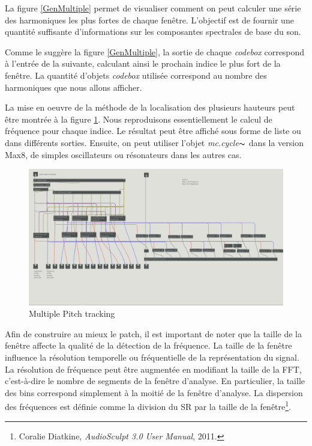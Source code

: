 La figure \ref{GenMultiple} permet de visualiser comment on peut calculer une série des harmoniques les plus fortes de chaque fenêtre. L'objectif est de fournir une quantité suffisante d'informations sur les composantes spectrales de base du son.

Comme le suggère la figure \ref{GenMultiple}, la sortie de chaque \textit{codebox} correspond à l'entrée de la suivante, calculant ainsi le prochain indice le plus fort de la fenêtre. La quantité d’objets \textit{codebox} utilisée correspond au nombre des harmoniques que nous allons afficher.

La mise en oeuvre de la méthode de la localisation des plusieurs hauteurs peut être montrée à la figure \ref{Analysis}. Nous reproduisons essentiellement le calcul de fréquence pour chaque indice. Le résultat peut être affiché sous forme de liste ou dans différents sorties. Ensuite, on peut utiliser l’objet \textit{mc.cycle$\thicksim $} dans la version Max8, de simples oscillateurs ou résonateurs dans les autres cas.

    \begin{figure}
        \centering
        \includegraphics[width = \textwidth]{Graphs/MultipleTrack.png}
        \caption{Multiple Pitch tracking}
        \label{Analysis}
    \end{figure}

Afin de construire au mieux le patch, il est important de noter que la taille de la fenêtre affecte la qualité de la détection de la fréquence. La taille de la fenêtre influence la résolution temporelle ou fréquentielle de la représentation du signal. La résolution de fréquence peut être augmentée en modifiant la taille de la FFT, c'est-à-dire le nombre de segments de la fenêtre d'analyse. En particulier, la taille des bins correspond simplement à la moitié de la fenêtre d’analyse. La dispersion des fréquences est définie comme la division du SR par la taille de la fenêtre\footnote{Coralie Diatkine, \textit{AudioSculpt 3.0 User Manual}, 2011. \nocite{Audiosculpt}}.

